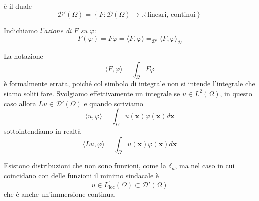 \documentclass[10pt,a4paper,twoside,openright]{book}
\begin{document}
\begin{definition}
	 è il duale
	\begin{equation*}
		\mathcal{D} '( \Omega ) =\left\{F:\mathcal{D}( \Omega )\rightarrow \mathbb{R} \ \text{lineari, continui}\right\}
	\end{equation*}
\end{definition}
Indichiamo \textit{l'azione di }$\displaystyle F$\textit{ su }$\displaystyle \varphi $:
\begin{equation*}
	F( \varphi ) =F\varphi =\langle F,\varphi \rangle =_{\mathcal{D} '} \langle F,\varphi \rangle _{\mathcal{D}}
\end{equation*}
\begin{nb}
	La notazione 
	\begin{equation*}
		\langle F,\varphi \rangle =\int _{\Omega } F\varphi 
	\end{equation*}
	è formalmente errata, poiché col simbolo di integrale non si intende l'integrale che siamo soliti fare. Svolgiamo effettivamente un integrale se $\displaystyle u\in L^{2}( \Omega )$, in questo caso allora $\displaystyle Lu\in \mathcal{D} '( \Omega )$ e quando scriviamo 
	\begin{equation*}
		\langle u,\varphi \rangle =\int _{\Omega } u(\mathbf{x}) \varphi (\mathbf{x}) d\mathbf{x}
	\end{equation*}
	sottointendiamo in realtà
	\begin{equation*}
		\langle Lu,\varphi \rangle =\int _{\Omega } u(\mathbf{x}) \varphi (\mathbf{x}) d\mathbf{x}
	\end{equation*}
\end{nb}
Esistono distribuzioni che non sono funzioni, come la $\displaystyle \delta _{n}$, ma nel caso in cui coincidano con delle funzioni il minimo sindacale è \ 
\begin{equation*}
	u\in L^{1}_{\text{loc}}( \Omega ) \subset \mathcal{D} '( \Omega )
\end{equation*}
che è anche un'immersione continua.
\end{document}

